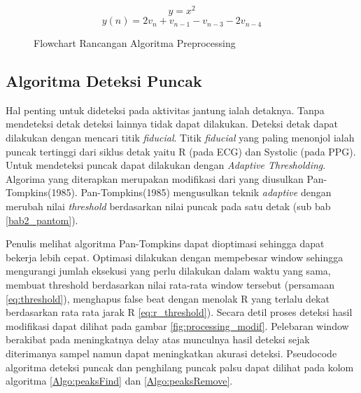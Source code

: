 \begin{equation}
y = x^{2}
\label{eq:square}
\end{equation}
\begin{equation}
y(n) = 2v_{n} + v_{n-1} - v_{n-3} - 2v_{n-4}
\label{eq:mwi}
\end{equation}

\begin{figure}[H]
	\centering
    \caption{Flowchart Rancangan Algoritma Preprocessing}
	\label{flow:fig_preproc_algorithm}
\end{figure}

\subsection{Algoritma Deteksi Puncak}
Hal penting untuk dideteksi pada aktivitas jantung ialah detaknya. Tanpa mendeteksi detak deteksi lainnya tidak dapat dilakukan. Deteksi detak dapat dilakukan dengan mencari titik \textit{fiducial}. Titik \textit{fiducial} yang paling menonjol ialah puncak tertinggi dari siklus detak yaitu R (pada ECG) dan Systolic (pada PPG). Untuk mendeteksi puncak dapat dilakukan dengan \textit{Adaptive Thresholding}. Algorima yang diterapkan merupakan modifikasi dari yang diusulkan Pan-Tompkins(1985). Pan-Tompkins(1985) mengusulkan teknik \textit{adaptive} dengan merubah nilai \textit{threshold} berdasarkan nilai puncak pada satu detak (sub bab \ref{bab2_pantom}). 

Penulis melihat algoritma Pan-Tompkins dapat dioptimasi sehingga dapat bekerja lebih cepat. Optimasi dilakukan dengan mempebesar window sehingga mengurangi jumlah eksekusi yang perlu dilakukan dalam waktu yang sama, membuat threshold berdasarkan nilai rata-rata window tersebut (persamaan \ref{eq:threshold}), menghapus false beat dengan menolak R yang terlalu dekat berdasarkan rata rata jarak R \ref{eq:r_threshold}). Secara detil proses deteksi hasil modifikasi dapat dilihat pada gambar \ref{fig:processing_modif}. Pelebaran window berakibat pada meningkatnya delay atas munculnya hasil deteksi sejak diterimanya sampel namun dapat meningkatkan akurasi deteksi. Pseudocode algoritma deteksi puncak dan penghilang puncak palsu dapat dilihat pada kolom algoritma \ref{Algo:peaksFind} dan \ref{Algo:peaksRemove}.

